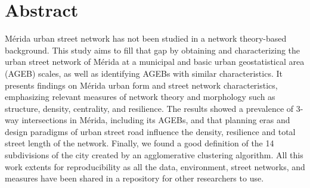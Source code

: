 \chapter{Abstract}
\label{cha:abstract}

Mérida urban street network has not been studied in a network theory-based background. This study aims to fill that gap by obtaining and characterizing the urban street network of Mérida at a municipal and basic urban geostatistical area (AGEB) scales, as well as identifying AGEBs with similar characteristics. It presents findings on Mérida urban form and street network characteristics, emphasizing relevant measures of network theory and morphology such as structure, density, centrality, and resilience. The results showed a prevalence of 3-way intersections in Mérida, including its AGEBs, and that planning eras and design paradigms of urban street road influence the density, resilience and total street length of the network. Finally, we found a good definition of the 14 subdivisions of the city created by an agglomerative clustering algorithm. All this work extents for reproducibility as all the data, environment, street networks, and measures have been shared in a repository for other researchers to use.